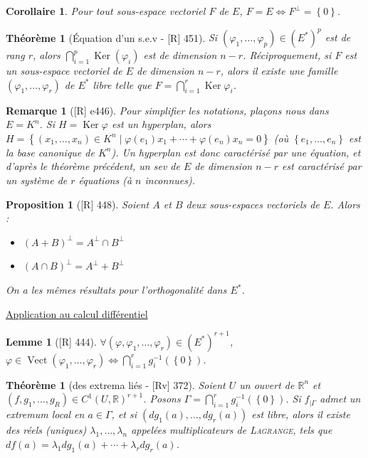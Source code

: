 \documentclass[10pt, a4paper, parskip=full, twoside, twocolumn]{report}
\newtheorem{theorem}[definition]{Théorème}
\newtheorem{proposition}[definition]{Proposition}
\newtheorem{lemma}[definition]{Lemme}
\newtheorem{corollary}[definition]{Corollaire}
\newtheorem{remark}[definition]{Remarque}
\newcommand{\IR}{\mathbb{R}}
\DeclareMathOperator{\Ker}{Ker}
\DeclareMathOperator{\Vect}{Vect}
\begin{document}
\begin{corollary}
	Pour tout sous-espace vectoriel $F$ de $E$, $F=E\iff F^{\perp}=\left\{0\right\}$.
\end{corollary}

\begin{theorem}[Équation d'un s.e.v - \textnormal{[R] 451}]
	Si $(\varphi_1,\dots,\varphi_p)\in (E^*)^p$ est de rang $r$, alors $\bigcap_{i=1}^{p}\Ker(\varphi_i)$ est de dimension $n-r$.
	Réciproquement, si $F$ est un sous-espace vectoriel de $E$ de dimension $n-r$, alors il existe une famille $(\varphi_1,\dots,\varphi_r)$ de $E^*$ libre telle que $F = \bigcap_{i=1}^{r} \Ker \varphi_i$.
\end{theorem}

\begin{remark}[\textnormal{[R] e446}]
	Pour simplifier les notations, plaçons nous dans $E = K^n$.
	Si $H = \Ker \varphi$ est un hyperplan, alors $H = \left\{(x_1,\dots,x_n)\in K^n\mid \varphi(e_1)x_1 + \cdots + \varphi(e_n)x_n = 0\right\}$ 
	(où $\left\{e_1,\dots, e_n\right\}$ est la base canonique de $K^n$).
	Un hyperplan est donc caractérisé par une équation, et d'après le théorème précédent, un sev de $E$ de dimension 
	$n-r$ est caractérisé par un système de $r$ équations (à $n$ inconnues).
\end{remark}

\begin{proposition}[\textnormal{[R] 448}]
	Soient $A$ et $B$ deux sous-espaces vectoriels de $E$.
	Alors :
	\begin{itemize}
		\item $\left(A + B\right)^{\perp} = A^{\perp} \cap B^{\perp}$
		\item $\left(A\cap B\right)^{\perp} = A^{\perp} + B^{\perp}$
	\end{itemize}
	On a les mêmes résultats pour l'orthogonalité dans $E^*$.
\end{proposition}

\textcolor{paragraphtext}{\underline{Application au calcul différentiel}}

\begin{lemma}[\textnormal{[R] 444}]
	$\forall (\varphi,\varphi_1,\dots,\varphi_r)\in \left(E^*\right)^{r+1}$,
	$\varphi \in\Vect(\varphi_1,\dots,\varphi_r)\iff \bigcap_{i=1}^r g_i^{-1}(\left\{0\right\})$.
\end{lemma}

\begin{theorem}[des extrema liés - \textnormal{[Rv] 372}]
	Soient $U$ un ouvert de $\IR^n$ et $(f,g_1,\dots, g_R)\in C^1(U,\IR)^{r+1}$. 
	Posons $\Gamma = \bigcap_{i=1}^r g_i^{-1}(\left\{0\right\})$.
	Si $f_{\mid \Gamma}$ admet un extremum local en $a\in \Gamma$, et si $(dg_1(a),\dots, dg_r(a))$ est libre, alors il existe des réels (uniques) $\lambda_1,\dots, \lambda_n$ appelées \emph{multiplicateurs de \textsc{Lagrange}},
	tels que $df(a) = \lambda_1dg_1(a)+\cdots + \lambda_r dg_r(a)$.
\end{theorem}
\end{document}
